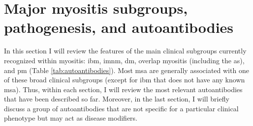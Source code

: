 \section{Major myositis subgroups, pathogenesis, and autoantibodies}

In this section I will review the features of the main clinical subgroups currently recognized within myositis: \gls{ibm}, \gls{imnm}, \gls{dm}, overlap myositis (including the \gls{as}), and \gls{pm} (Table \ref{tab:autoantibodies}). Most \gls{msa} are generally associated with one of these broad clinical subgroups (except for \gls{ibm} that does not have any known \gls{msa}). Thus, within each section, I will review the most relevant autoantibodies that have been described so far. Moreover, in the last section, I will briefly discuss a group of autoantibodies that are not specific for a particular clinical phenotype but may act as disease modifiers.


